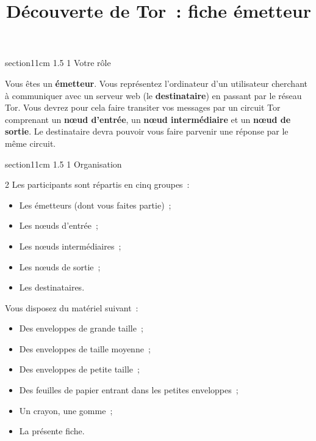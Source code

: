 \documentclass[a4paper,twoside,french]{article}
\makeatletter
\renewcommand\section{\@startsection
  {section}{1}{1cm}%
  {1.5\baselineskip}%
  {1\baselineskip}%
  {\normalfont\Large\bfseries}}%
\makeatother
\begin{document}
  
  \title{Découverte de Tor~: fiche \og émetteur\fg}
  \date{}

  \maketitle
  \pagestyle{empty}
  \thispagestyle{empty}

  \section{Votre rôle}

  Vous êtes un \textbf{émetteur}. Vous représentez l'ordinateur d'un
  utilisateur cherchant à communiquer avec un serveur web (le
  \textbf{destinataire}) en passant par le réseau Tor. Vous devrez
  pour cela faire transiter vos messages par un circuit Tor comprenant
  un \textbf{n\oe ud d'entrée}, un \textbf{n\oe ud intermédiaire} et
  un \textbf{n\oe ud de sortie}. Le destinataire devra pouvoir vous
  faire parvenir une réponse par le même circuit.
  
  \section{Organisation}

  \begin{multicols}{2}
    Les participants sont répartis en cinq groupes~:
    \begin{itemize}
    \item Les émetteurs (dont vous faites partie)~;
    \item Les n\oe uds d'entrée~;
    \item Les n\oe uds intermédiaires~;
    \item Les n\oe uds de sortie~;
    \item Les destinataires.
    \end{itemize}
    \vfill\columnbreak

    Vous disposez du matériel suivant~:
    \begin{itemize}
    \item Des enveloppes de grande taille~;
    \item Des enveloppes de taille moyenne~;
    \item Des enveloppes de petite taille~;
    \item Des feuilles de papier entrant dans les petites enveloppes~;
    \item Un crayon, une gomme~;
    \item La présente fiche.
    \end{itemize}
  \end{multicols}
\end{document}
